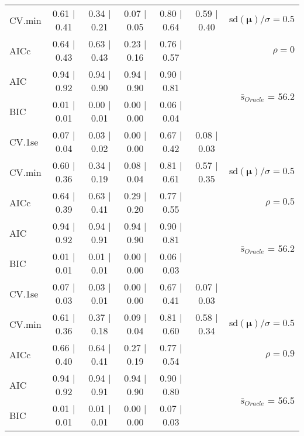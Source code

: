\begin{table}
\begin{center}
\begin{tabular}{l*{5}{c}|r}
CV.min & 0.61 $\mid$ 0.41 & 0.34 $\mid$ 0.21 & 0.07 $\mid$ 0.05 & 0.80 $\mid$ 0.64 & 0.59 $\mid$ 0.40 &  $\mathrm{sd}(\mathbf{\mu})/\sigma=0.5$ \\
AICc & 0.64 $\mid$ 0.43 & 0.63 $\mid$ 0.43 & 0.23 $\mid$ 0.16 & 0.76 $\mid$ 0.57 & & $\rho=0$ \\
AIC & 0.94 $\mid$ 0.92 & 0.94 $\mid$ 0.90 & 0.94 $\mid$ 0.90 & 0.90 $\mid$ 0.81 & &  \multirow{2}{*}{$\bar{s}_{Oracle}$ = 56.2} \\
BIC & 0.01 $\mid$ 0.01 & 0.00 $\mid$ 0.01 & 0.00 $\mid$ 0.00 & 0.06 $\mid$ 0.04 & &  \\
 \hline 
CV.1se & 0.07 $\mid$ 0.04 & 0.03 $\mid$ 0.02 & 0.00 $\mid$ 0.00 & 0.67 $\mid$ 0.42 & 0.08 $\mid$ 0.03 & \\
CV.min & 0.60 $\mid$ 0.36 & 0.34 $\mid$ 0.19 & 0.08 $\mid$ 0.04 & 0.81 $\mid$ 0.61 & 0.57 $\mid$ 0.35 &  $\mathrm{sd}(\mathbf{\mu})/\sigma=0.5$ \\
AICc & 0.64 $\mid$ 0.39 & 0.63 $\mid$ 0.41 & 0.29 $\mid$ 0.20 & 0.77 $\mid$ 0.55 & & $\rho=0.5$ \\
AIC & 0.94 $\mid$ 0.92 & 0.94 $\mid$ 0.91 & 0.94 $\mid$ 0.90 & 0.90 $\mid$ 0.81 & &  \multirow{2}{*}{$\bar{s}_{Oracle}$ = 56.2} \\
BIC & 0.01 $\mid$ 0.01 & 0.01 $\mid$ 0.01 & 0.00 $\mid$ 0.00 & 0.06 $\mid$ 0.03 & &  \\
 \hline 
CV.1se & 0.07 $\mid$ 0.03 & 0.03 $\mid$ 0.01 & 0.00 $\mid$ 0.00 & 0.67 $\mid$ 0.41 & 0.07 $\mid$ 0.03 & \\
CV.min & 0.61 $\mid$ 0.36 & 0.37 $\mid$ 0.18 & 0.09 $\mid$ 0.04 & 0.81 $\mid$ 0.60 & 0.58 $\mid$ 0.34 &  $\mathrm{sd}(\mathbf{\mu})/\sigma=0.5$ \\
AICc & 0.66 $\mid$ 0.40 & 0.64 $\mid$ 0.41 & 0.27 $\mid$ 0.19 & 0.77 $\mid$ 0.54 & & $\rho=0.9$ \\
AIC & 0.94 $\mid$ 0.92 & 0.94 $\mid$ 0.91 & 0.94 $\mid$ 0.90 & 0.90 $\mid$ 0.80 & &  \multirow{2}{*}{$\bar{s}_{Oracle}$ = 56.5} \\
BIC & 0.01 $\mid$ 0.01 & 0.01 $\mid$ 0.01 & 0.00 $\mid$ 0.00 & 0.07 $\mid$ 0.03 & &  \\
 \hline 
\end{tabular}
\end{center}
\vspace{-1cm}
\end{table}





